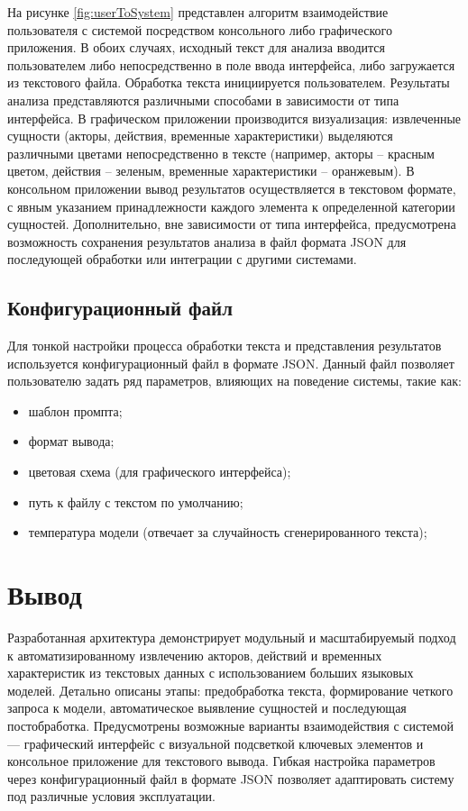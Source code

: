 На рисунке \ref{fig:userToSystem} представлен алгоритм взаимодействие пользователя с системой посредством консольного либо графического приложения. 
В обоих случаях, исходный текст для анализа вводится пользователем либо непосредственно в поле ввода интерфейса, либо загружается из текстового файла. 
Обработка текста инициируется пользователем. Результаты анализа представляются различными способами в зависимости от типа интерфейса. 
В графическом приложении производится визуализация: извлеченные сущности (акторы, действия, временные характеристики) 
выделяются различными цветами непосредственно в тексте (например, акторы – красным цветом, действия – зеленым, временные характеристики – оранжевым). 
В консольном приложении вывод результатов осуществляется в текстовом формате, с явным указанием принадлежности каждого элемента к определенной категории сущностей. 
Дополнительно, вне зависимости от типа интерфейса, предусмотрена возможность сохранения результатов анализа в файл формата JSON для последующей обработки или интеграции 
с другими системами.

\subsection{Конфигурационный файл}

Для тонкой настройки процесса обработки текста и представления результатов используется конфигурационный файл в формате JSON.  
Данный файл позволяет пользователю задать ряд параметров, влияющих на поведение системы, такие как:
\begin{itemize}
    \item шаблон промпта;
    \item формат вывода;
    \item цветовая схема (для графического интерфейса);
    \item путь к файлу с текстом по умолчанию;
    \item температура модели (отвечает за случайность сгенерированного текста);
\end{itemize}

\section*{Вывод}

Разработанная архитектура демонстрирует модульный и масштабируемый подход к автоматизированному извлечению акторов, действий и временных характеристик из текстовых данных с использованием больших языковых моделей. 
Детально описаны этапы: предобработка текста, формирование четкого запроса к модели, автоматическое выявление сущностей и последующая постобработка.
Предусмотрены возможные варианты взаимодействия с системой — графический интерфейс с визуальной подсветкой ключевых элементов 
и консольное приложение для текстового вывода. 
Гибкая настройка параметров через конфигурационный файл в формате JSON позволяет адаптировать систему под различные условия эксплуатации.


\clearpage